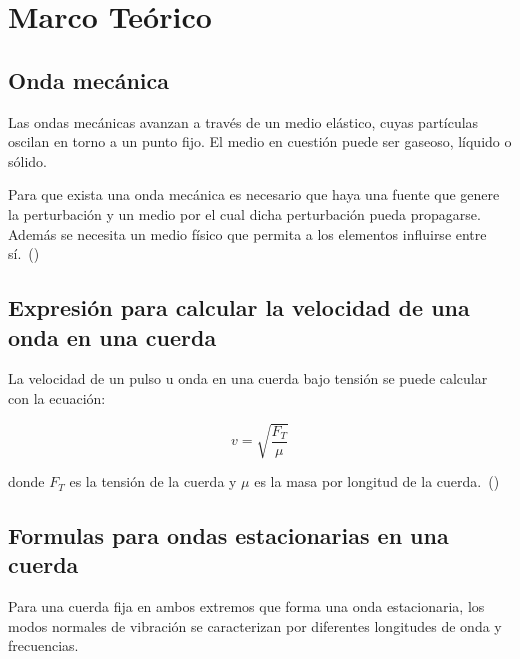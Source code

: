 \documentclass[twocolumn, 12pt]{article}
\begin{document}
\section{Marco Teórico}

\subsection{Onda mecánica}

Las ondas mecánicas avanzan a través de un medio elástico,
cuyas partículas oscilan en torno a un punto fijo. El medio
en cuestión puede ser gaseoso, líquido o sólido.

Para que exista una onda mecánica es necesario que haya una
fuente que genere la perturbación y un medio por el cual
dicha perturbación pueda propagarse. Además se necesita un
medio físico que permita a los elementos influirse entre
sí.~(\cite{J_Merino_2022})

\subsection{Expresión para calcular la velocidad de una onda en una cuerda}

La velocidad de un pulso u onda en una cuerda bajo tensión
se puede calcular con la ecuación:

\begin{equation}
    v = \sqrt{\frac{F_T}{\mu}}
    \label{eq:velocidad-onda-cuerda}
\end{equation}

donde $F_T$ es la tensión de la cuerda y $\mu$ es la masa
por longitud de la cuerda.~(\cite{Moebs_2021})

\subsection{Formulas para ondas estacionarias en una cuerda}

Para una cuerda fija en ambos extremos que forma una onda
estacionaria, los modos normales de vibración se
caracterizan por diferentes longitudes de onda y
frecuencias.
\end{document}
